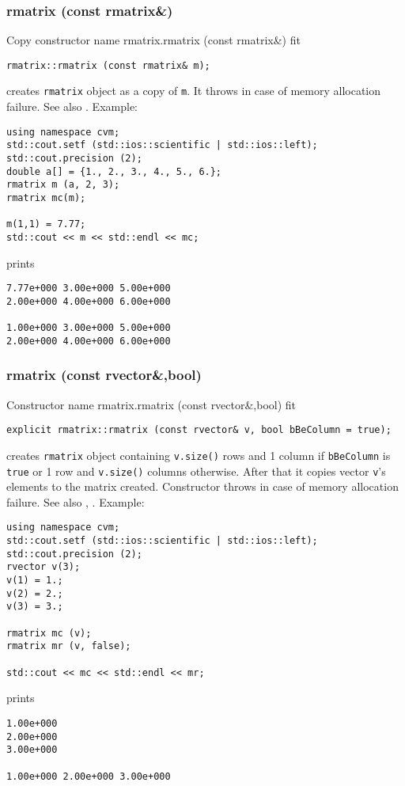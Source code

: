 \subsubsection{rmatrix (const rmatrix\&)}
Copy constructor%
\pdfdest name {rmatrix.rmatrix (const rmatrix&)} fit
\begin{verbatim}
rmatrix::rmatrix (const rmatrix& m);
\end{verbatim}
creates  \verb"rmatrix" object as a copy of \verb"m".
It throws  
in case of memory allocation failure.
See also .
Example:
\begin{Verbatim}
using namespace cvm;
std::cout.setf (std::ios::scientific | std::ios::left);
std::cout.precision (2);
double a[] = {1., 2., 3., 4., 5., 6.};
rmatrix m (a, 2, 3);
rmatrix mc(m);

m(1,1) = 7.77;
std::cout << m << std::endl << mc;
\end{Verbatim}
prints
\begin{Verbatim}
7.77e+000 3.00e+000 5.00e+000
2.00e+000 4.00e+000 6.00e+000

1.00e+000 3.00e+000 5.00e+000
2.00e+000 4.00e+000 6.00e+000
\end{Verbatim}
\newpage




\subsubsection{rmatrix (const rvector\&,bool)}
Constructor%
\pdfdest name {rmatrix.rmatrix (const rvector&,bool)} fit
\begin{verbatim}
explicit rmatrix::rmatrix (const rvector& v, bool bBeColumn = true);
\end{verbatim}
creates  \verb"rmatrix" object containing \verb"v.size()" rows and
1 column if \verb"bBeColumn" is \verb"true" or 1 row and
\verb"v.size()" columns otherwise.
After that it copies  vector \verb"v"'s elements to
the matrix created.
Constructor throws  
in case of memory allocation failure.
See also , .
Example:
\begin{Verbatim}
using namespace cvm;
std::cout.setf (std::ios::scientific | std::ios::left);
std::cout.precision (2);
rvector v(3);
v(1) = 1.;
v(2) = 2.;
v(3) = 3.;

rmatrix mc (v);
rmatrix mr (v, false);

std::cout << mc << std::endl << mr;
\end{Verbatim}
prints
\begin{Verbatim}
1.00e+000
2.00e+000
3.00e+000

1.00e+000 2.00e+000 3.00e+000
\end{Verbatim}
\newpage



